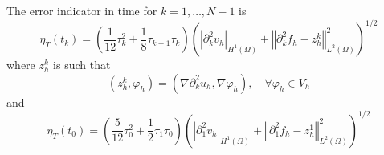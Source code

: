 \documentclass{imanum}
\begin{document}
\begin{theorem}
The error indicator in time for $k=1,\dots,N-1$ is
\begin{equation}\label{in}
\eta_T (t_k)=\left(\frac{1}{12}\tau_{k}^2+\frac{1}{8}\tau_{k-1}\tau_{k}\right)\left(\left\vert\partial _{k}^{2}{v_h}\right\vert_{H^1(\Omega)}
+ \left\Vert \partial _{k}^{2}{f_h} - z_h^k\right\Vert_{L^2(\Omega)}^2\right)^{1/2}
\end{equation}
where $z^k_h$ is such that
\begin{equation}\label{zh}
\left(z_h^k, \varphi_h\right) =(\nabla \partial _{k}^{2}{u_h}, \nabla\varphi_h),
\quad\forall\varphi_h\in V_h
\end{equation}
and
\begin{equation}\label{in0step}
\eta_T (t_0)=\left(\frac{5}{12}\tau_{0}^2+\frac{1}{2}\tau_{1}\tau_{0}\right)\left(\left\vert\partial _{1}^{2}{v_h}\right\vert_{H^1(\Omega)}
+ \left\Vert \partial _{1}^{2}{f_h} - z^1_h\right\Vert_{L^2(\Omega)}^2\right)^{1/2}
\end{equation}
\end{theorem}
\end{document}
